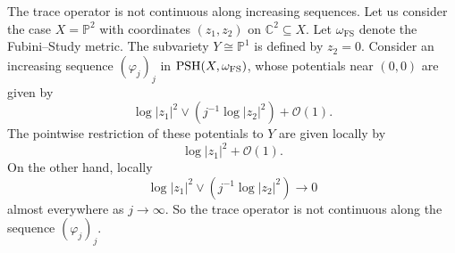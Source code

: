 \begin{example}\label{ex:trace:L407}
    The trace operator is not continuous along increasing sequences. Let us consider the case $X=\mathbb{P}^2$ with coordinates $(z_1,z_2)$ on $\mathbb{C}^2\subseteq X$. Let $\omega_{\mathrm{{FS}}}$ denote the Fubini--Study metric.
    The subvariety $Y\cong \mathbb{P}^1$ is defined by $z_2=0$. Consider an increasing sequence $(\varphi_j)_j$ in $\mathrm{PSH}(X,\omega_{\mathrm{FS}})$, whose potentials near $(0,0)$ are given by
    \[
    \log |z_1|^2\lor \left( j^{-1}\log |z_2|^2\right)+\mathcal{O}(1).
    \]
    The pointwise restriction of these potentials to $Y$ are given locally by
    \[
    \log |z_1|^2+\mathcal{O}(1).
    \]
    On the other hand, locally
    \[
    \log |z_1|^2\lor \left( j^{-1}\log |z_2|^2\right)\to 0
    \]
    almost everywhere as $j\to\infty$. So the trace operator is not continuous along the sequence $(\varphi_j)_j$.
\end{example}



